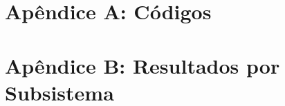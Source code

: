 \begin{apendicesenv}

\chapter*{Apêndice A: Códigos}
\lipsum[1-1]

\chapter*{Apêndice B: Resultados por Subsistema}
\lipsum[1-1]

\end{apendicesenv}